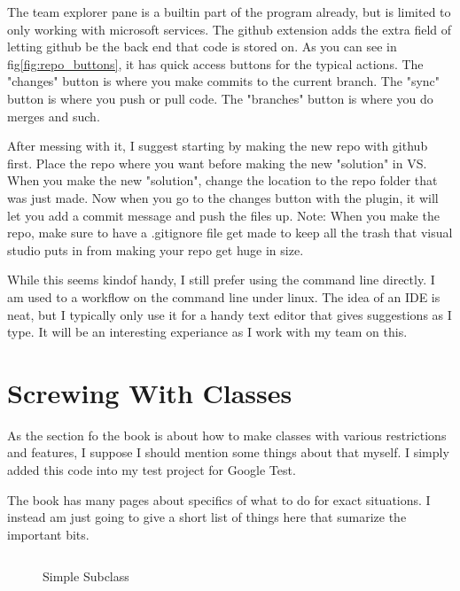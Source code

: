 \documentclass[12pt]{article}
\begin{document}
The team explorer pane is a builtin part of the program already, but is limited to only working with microsoft services.
The github extension adds the extra field of letting github be the back end that code is stored on.
As you can see in fig\ref{fig:repo_buttons}, it has quick access buttons for the typical actions.
The "changes" button is where you make commits to the current branch.
The "sync" button is where you push or pull code.
The "branches" button is where you do merges and such.

After messing with it, I suggest starting by making the new repo with github first.
Place the repo where you want before making the new "solution" in VS.
When you make the new "solution", change the location to the repo folder that was just made.
Now when you go to the changes button with the plugin, it will let you add a commit message and push the files up.
Note: When you make the repo, make sure to have a .gitignore file get made to keep all the trash that visual studio puts in from making your repo get huge in size.

While this seems kindof handy, I still prefer using the command line directly.
I am used to a workflow on the command line under linux.
The idea of an IDE is neat, but I typically only use it for a handy text editor that gives suggestions as I type.
It will be an interesting experiance as I work with my team on this.

\section{Screwing With Classes}

As the section fo the book is about how to make classes with various restrictions and features, I suppose I should mention some things about that myself.
I simply added this code into my test project for Google Test.

The book has many pages about specifics of what to do for exact situations.
I instead am just going to give a short list of things here that sumarize the important bits.

\begin{figure}[ht]
	\begin{verbatim}
	\end{verbatim}
	\caption{Simple Subclass}
	\label{fig:class_ex1}
\end{figure}
\end{document}
